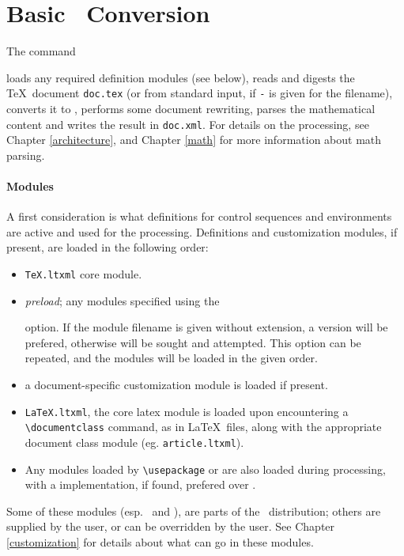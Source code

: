 \documentclass{report}
\begin{document}
\section{Basic \XML\ Conversion}\label{usage.conversion}
The command
\begin{quote}
\end{quote}
loads any required definition modules (see below),
reads and digests the \TeX\ document \texttt{doc.tex}
(or from standard input, if \texttt{-} is given for the filename),
converts it to \XML,
performs some document rewriting, parses the mathematical content
and writes the result in \texttt{doc.xml}.
For details on the processing, see Chapter \ref{architecture},
and Chapter \ref{math} for more information about math parsing.

\paragraph{Modules}
A first consideration is what definitions for control sequences and
environments are active and used for the processing.
Definitions and customization modules, if present, are loaded in the following
order:
\begin{itemize}
  \item \texttt{TeX.ltxml} core module.
  \item \textit{preload}; any modules specified using the
    \begin{quote}
    \end{quote}
    option. If the module filename is given without extension,
    a  version will be prefered, otherwise  will
    be sought and attempted.
    This option can be repeated, and the modules will be loaded in the
    given order.
  \item {} a document-specific customization module
    is loaded if present.
  \item \texttt{LaTeX.ltxml}, the core latex module is loaded
    upon encountering a \verb|\documentclass| command, as in \LaTeX\ files,
    along with the appropriate document class module (eg. \texttt{article.ltxml}).
  \item Any modules loaded by \verb|\usepackage| or \verb|| are
    also loaded during processing, with a  implementation, if found,
    prefered over .
\end{itemize}
Some of these modules (esp.~ and ), are parts of
the \LaTeXML\ distribution; others are supplied by the user, or can be
overridden by the user.
See Chapter \ref{customization} for details about what can go in these modules.
\end{document}
